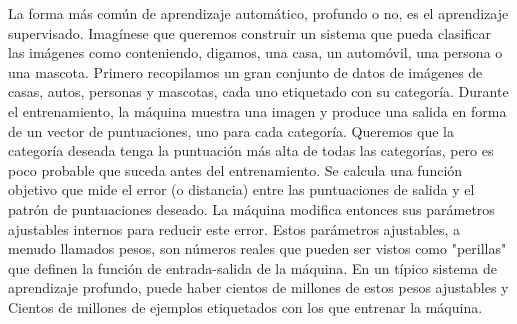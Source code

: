 




La forma más común de aprendizaje automático, profundo o no, es el aprendizaje supervisado. Imagínese que queremos construir un sistema que pueda clasificar las imágenes como conteniendo, digamos, una casa, un automóvil, una persona o una mascota. Primero recopilamos un gran conjunto de datos de imágenes de casas, autos, personas y mascotas, cada uno etiquetado con su categoría. Durante el entrenamiento, la máquina muestra una imagen y produce una salida en forma de un vector de puntuaciones, uno para cada categoría. Queremos que la categoría deseada tenga la puntuación más alta de todas las categorías, pero es poco probable que suceda antes del entrenamiento. Se calcula una función objetivo que mide el error (o distancia) entre las puntuaciones de salida y el patrón de puntuaciones deseado. La máquina modifica entonces sus parámetros ajustables internos para reducir este error. Estos parámetros ajustables, a menudo llamados pesos, son números reales que pueden ser vistos como "perillas" que definen la función de entrada-salida de la máquina. En un típico sistema de aprendizaje profundo, puede haber cientos de millones de estos pesos ajustables y Cientos de millones de ejemplos etiquetados con los que entrenar la máquina.





